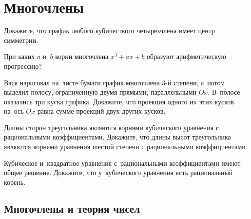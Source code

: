 
\section*{Многочлены}


\begin{problems}

\item
Докажите, что график любого кубичествого четырехчлена имеет центр симметрии.

\item
При каких $a$ и~$b$ корни многочлена $x^3 + a x + b$ образуют арифметическую
прогрессию?

\item
Вася нарисовал на~листе бумаги график многочлена $3$-й степени, а~потом выделил
полосу, ограниченную двумя прямыми, параллельными $Ox$.
В~полосе оказались три куска графика.
Докажите, что проекция одного из~этих кусков на~ось $Ox$ равна сумме проекций
двух других кусков.

\item
Длины сторон треугольника являются корнями кубического уравнения
с рациональными коэффициентами.
Докажите, что длины высот треугольника являются корнями уравнения шестой
степени с рациональными коэффициентами.

\item
Кубическое и~квадратное уравнения с~рациональными коэффициентами имеют общее
решение.
Докажите, что у~кубического уравнения есть рациональный корень.

\end{problems}

\subsection*{Многочлены и теория чисел}

